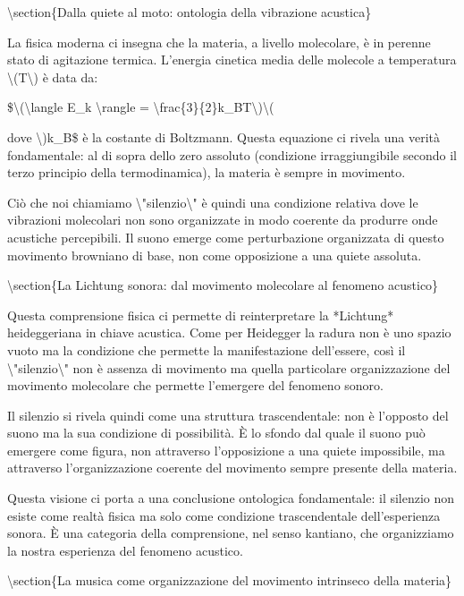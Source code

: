 \documentclass[a4paper,11pt]{article}
\begin{document}
\textbackslash{}section\{Dalla quiete al moto: ontologia della vibrazione acustica\}

La fisica moderna ci insegna che la materia, a livello molecolare, \`e in
perenne stato di agitazione termica. L'energia cinetica media delle
molecole a temperatura \textbackslash{}(T\textbackslash{}) \`e data da:

\$\textbackslash{}(\textbackslash{}langle E\_k \textbackslash{}rangle = \textbackslash{}frac\{3\}\{2\}k\_BT\textbackslash{})\textbackslash{}(

dove \textbackslash{})k\_B\$ \`e la costante di Boltzmann. Questa equazione ci rivela una
verit\`a fondamentale: al di sopra dello zero assoluto (condizione
irraggiungibile secondo il terzo principio della termodinamica), la
materia \`e sempre in movimento.

Ci\`o che noi chiamiamo \textbackslash{}"silenzio\textbackslash{}" \`e quindi una condizione relativa dove
le vibrazioni molecolari non sono organizzate in modo coerente da
produrre onde acustiche percepibili. Il suono emerge come perturbazione
organizzata di questo movimento browniano di base, non come opposizione
a una quiete assoluta.

\textbackslash{}section\{La Lichtung sonora: dal movimento molecolare al fenomeno acustico\}

Questa comprensione fisica ci permette di reinterpretare la *Lichtung*
heideggeriana in chiave acustica. Come per Heidegger la radura non \`e uno
spazio vuoto ma la condizione che permette la manifestazione
dell'essere, cos\`i il \textbackslash{}"silenzio\textbackslash{}" non \`e assenza di movimento ma quella
particolare organizzazione del movimento molecolare che permette
l'emergere del fenomeno sonoro.

Il silenzio si rivela quindi come una struttura trascendentale: non \`e
l'opposto del suono ma la sua condizione di possibilit\`a. \`E lo sfondo dal
quale il suono pu\`o emergere come figura, non attraverso l'opposizione a
una quiete impossibile, ma attraverso l'organizzazione coerente del
movimento sempre presente della materia.

Questa visione ci porta a una conclusione ontologica fondamentale: il
silenzio non esiste come realt\`a fisica ma solo come condizione
trascendentale dell'esperienza sonora. \`E una categoria della
comprensione, nel senso kantiano, che organizziamo la nostra esperienza
del fenomeno acustico.


\textbackslash{}section\{La musica come organizzazione del movimento intrinseco della materia\}
\end{document}
